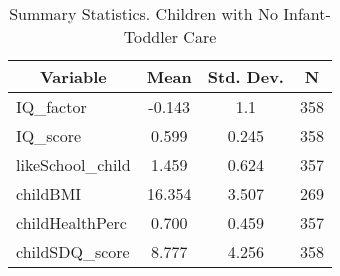 
\begin{table}[htbp]\centering \caption{Summary Statistics. Children with No Infant-Toddler Care \label{schoolChildasiloNone}}
\begin{tabular}{l c c  c}\hline\hline
\multicolumn{1}{c}{\textbf{Variable}} & \textbf{Mean}
 & \textbf{Std. Dev.} & \textbf{N}\\ \hline
IQ\_factor & -0.143 & 1.1  & 358\\
IQ\_score & 0.599 & 0.245  & 358\\
likeSchool\_child & 1.459 & 0.624  & 357\\
childBMI & 16.354 & 3.507  & 269\\
childHealthPerc & 0.700 & 0.459  & 357\\
childSDQ\_score & 8.777 & 4.256  & 358\\
\hline\end{tabular}
\end{table}
